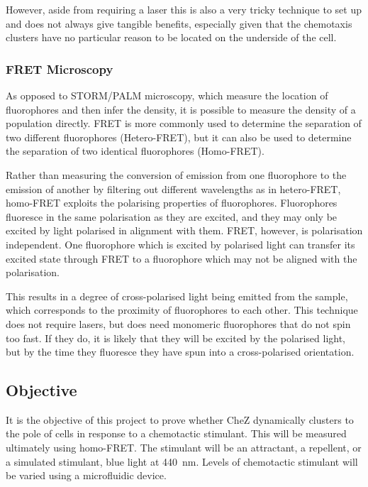 \documentclass[../main.tex]{subfiles}
\begin{document}
However, aside from requiring a laser this is also a very tricky technique to set up and does not always give tangible benefits, especially given that the chemotaxis clusters have no particular reason to be located on the underside of the cell.

\subsubsection{FRET Microscopy}
As opposed to STORM/PALM microscopy, which measure the location of fluorophores and then infer the density, it is possible to measure the density of a population directly. FRET is more commonly used to determine the separation of two different fluorophores (Hetero-FRET), but it can also be used to determine the separation of two identical fluorophores (Homo-FRET).

Rather than measuring the conversion of emission from one fluorophore to the emission of another by filtering out different wavelengths as in hetero-FRET, homo-FRET exploits the polarising properties of fluorophores. Fluorophores fluoresce in the same polarisation as they are excited, and they may only be excited by light polarised in alignment with them. FRET, however, is polarisation independent. One fluorophore which is excited by polarised light can transfer its excited state through FRET to a fluorophore which may not be aligned with the polarisation. 

This results in a degree of cross-polarised light being emitted from the sample, which corresponds to the proximity of fluorophores to each other. This technique does not require lasers, but does need monomeric fluorophores that do not spin too fast. If they do, it is likely that they will be excited by the polarised light, but by the time they fluoresce they have spun into a cross-polarised orientation.

\subsection{Objective}
It is the objective of this project to prove whether CheZ dynamically clusters to the pole of \ecoli cells in response to a chemotactic stimulant. This will be measured ultimately using homo-FRET. The stimulant will be an attractant, a repellent, or a simulated stimulant, blue light at \SI{440}{\nano\meter}\cite{wright06}. Levels of chemotactic stimulant will be varied using a microfluidic device.
\end{document}
